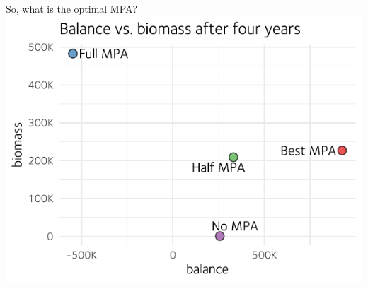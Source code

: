 \documentclass[table, 14pt, aspectratio=169]{beamer}
\begin{document}
\begin{frame}{So, what is the optimal MPA?}
  \centering
  \includegraphics[height=0.8\textheight]{images/experiment_xy.pdf}
\end{frame}
\end{document}
